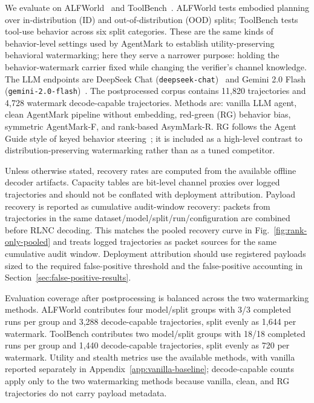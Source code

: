 \documentclass[conference,compsoc]{IEEEtran}
\newcommand{\ours}{AsymMark-R}
\newcommand{\agentmark}{AgentMark-F}
\begin{document}
We evaluate on ALFWorld~\cite{shridhar2021alfworld} and ToolBench~\cite{qin2023toolllm}. ALFWorld tests embodied planning over in-distribution (ID) and out-of-distribution (OOD) splits; ToolBench tests tool-use behavior across six split categories. These are the same kinds of behavior-level settings used by AgentMark to establish utility-preserving behavioral watermarking; here they serve a narrower purpose: holding the behavior-watermark carrier fixed while changing the verifier's channel knowledge. The LLM endpoints are DeepSeek Chat (\texttt{deepseek-chat})~\cite{deepseek2024} and Gemini 2.0 Flash (\texttt{gemini-2.0-flash})~\cite{team2023gemini}. The postprocessed corpus contains 11,820 trajectories and 4,728 watermark decode-capable trajectories. Methods are: vanilla LLM agent, clean AgentMark pipeline without embedding, red-green (RG) behavior bias, symmetric \agentmark{}, and rank-based \ours{}. RG follows the Agent Guide style of keyed behavior steering~\cite{agentguide2025}; it is included as a high-level contrast to distribution-preserving watermarking rather than as a tuned competitor.

Unless otherwise stated, recovery rates are computed from the available offline decoder artifacts. Capacity tables are bit-level channel proxies over logged trajectories and should not be conflated with deployment attribution. Payload recovery is reported as cumulative audit-window recovery: packets from trajectories in the same dataset/model/split/run/configuration are combined before RLNC decoding. This matches the pooled recovery curve in Fig.~\ref{fig:rank-only-pooled} and treats logged trajectories as packet sources for the same cumulative audit window. Deployment attribution should use registered payloads sized to the required false-positive threshold and the false-positive accounting in Section~\ref{sec:false-positive-results}.

Evaluation coverage after postprocessing is balanced across the two watermarking methods. ALFWorld contributes four model/split groups with 3/3 completed runs per group and 3,288 decode-capable trajectories, split evenly as 1,644 per watermark. ToolBench contributes two model/split groups with 18/18 completed runs per group and 1,440 decode-capable trajectories, split evenly as 720 per watermark. Utility and stealth metrics use the available methods, with vanilla reported separately in Appendix~\ref{app:vanilla-baseline}; decode-capable counts apply only to the two watermarking methods because vanilla, clean, and RG trajectories do not carry payload metadata.
\end{document}
